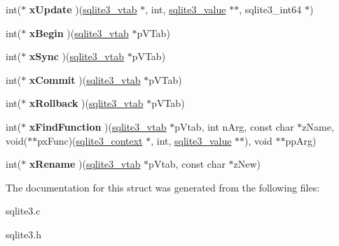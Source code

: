 \begin{DoxyCompactItemize}
\item 
\hypertarget{structsqlite3__module_a029d0713dbb3c847a6de773a0a179605}{int($\ast$ {\bfseries x\-Update} )(\hyperlink{structsqlite3__vtab}{sqlite3\-\_\-vtab} $\ast$, int, \hyperlink{struct_mem}{sqlite3\-\_\-value} $\ast$$\ast$, sqlite3\-\_\-int64 $\ast$)}\label{structsqlite3__module_a029d0713dbb3c847a6de773a0a179605}

\item 
\hypertarget{structsqlite3__module_af3ea97df2b110da6ceb4797222e6d86f}{int($\ast$ {\bfseries x\-Begin} )(\hyperlink{structsqlite3__vtab}{sqlite3\-\_\-vtab} $\ast$p\-V\-Tab)}\label{structsqlite3__module_af3ea97df2b110da6ceb4797222e6d86f}

\item 
\hypertarget{structsqlite3__module_a895d78529db2e28e13d1d842512770b6}{int($\ast$ {\bfseries x\-Sync} )(\hyperlink{structsqlite3__vtab}{sqlite3\-\_\-vtab} $\ast$p\-V\-Tab)}\label{structsqlite3__module_a895d78529db2e28e13d1d842512770b6}

\item 
\hypertarget{structsqlite3__module_a465df78231717713e98677c19e60cece}{int($\ast$ {\bfseries x\-Commit} )(\hyperlink{structsqlite3__vtab}{sqlite3\-\_\-vtab} $\ast$p\-V\-Tab)}\label{structsqlite3__module_a465df78231717713e98677c19e60cece}

\item 
\hypertarget{structsqlite3__module_a3f8676e941a3080557fe10528e04e2f1}{int($\ast$ {\bfseries x\-Rollback} )(\hyperlink{structsqlite3__vtab}{sqlite3\-\_\-vtab} $\ast$p\-V\-Tab)}\label{structsqlite3__module_a3f8676e941a3080557fe10528e04e2f1}

\item 
\hypertarget{structsqlite3__module_ae70a020a7dda960b91943e9f67695dbb}{int($\ast$ {\bfseries x\-Find\-Function} )(\hyperlink{structsqlite3__vtab}{sqlite3\-\_\-vtab} $\ast$p\-Vtab, int n\-Arg, const char $\ast$z\-Name, void($\ast$$\ast$px\-Func)(\hyperlink{structsqlite3__context}{sqlite3\-\_\-context} $\ast$, int, \hyperlink{struct_mem}{sqlite3\-\_\-value} $\ast$$\ast$), void $\ast$$\ast$pp\-Arg)}\label{structsqlite3__module_ae70a020a7dda960b91943e9f67695dbb}

\item 
\hypertarget{structsqlite3__module_af886782e9a1ea5c4b131b2bc373c8092}{int($\ast$ {\bfseries x\-Rename} )(\hyperlink{structsqlite3__vtab}{sqlite3\-\_\-vtab} $\ast$p\-Vtab, const char $\ast$z\-New)}\label{structsqlite3__module_af886782e9a1ea5c4b131b2bc373c8092}

\end{DoxyCompactItemize}


The documentation for this struct was generated from the following files\-:\begin{DoxyCompactItemize}
\item 
sqlite3.\-c\item 
sqlite3.\-h\end{DoxyCompactItemize}
